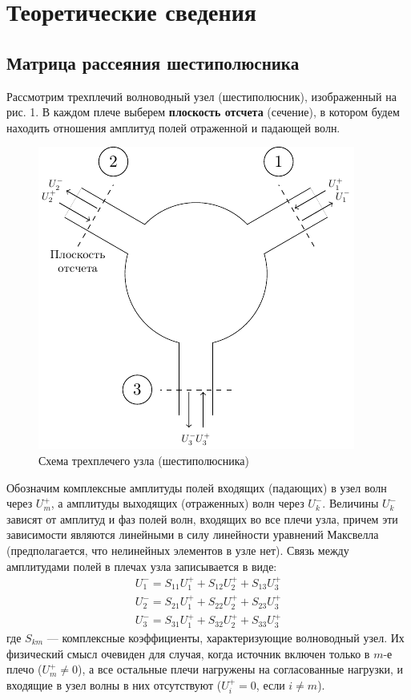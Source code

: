 \documentclass[a4paper,12pt]{article}
\begin{document}
\section{Теоретические сведения}
\subsection{Матрица рассеяния шестиполюсника}

Рассмотрим трехплечий волноводный узел (шестиполюсник), изображенный на рис. 1. В каждом плече выберем \textbf{плоскость отсчета} (сечение), в котором будем находить отношения амплитуд полей отраженной и падающей волн.

\begin{figure}[h!]
	\centering
	\includegraphics[scale=1.5]{ris/ris1}
	\caption{Схема трехплечего узла (шестиполюсника)}
	\label{fig:figure1}
\end{figure}

Обозначим комплексные амплитуды полей входящих (падающих) в узел волн через $U_m^+$, а амплитуды выходящих (отраженных) волн через $U_k^-$. 
Величины $U_k^-$ зависят от амплитуд и фаз полей волн, входящих во все плечи узла, причем эти зависимости являются линейными в силу линейности уравнений Максвелла (предполагается, что нелинейных элементов в узле нет). 
Связь между амплитудами полей в плечах узла записывается в виде:
\begin{equation}
	\begin{array} { l } { U _ { 1 } ^ { - } = S _ { 11 } U _ { 1 } ^ { + } + S _ { 12 } U _ { 2 } ^ { + } + S _ { 13 } U _ { 3 } ^ { + } } \\ { U _ { 2 } ^ { - } = S _ { 21 } U _ { 1 } ^ { + } + S _ { 22 } U _ { 2 } ^ { + } + S _ { 23 } U _ { 3 } ^ { + } } \\ { U _ { 3 } ^ { - } = S _ { 31 } U _ { 1 } ^ { + } + S _ { 32 } U _ { 2 } ^ { + } + S _ { 33 } U _ { 3 } ^ { + } } \end{array}
\end{equation}
где $S_{km}$ ---  комплексные коэффициенты, характеризующие волноводный узел. 
Их физический смысл очевиден для случая, когда источник включен только в $m$-е плечо ($U_m^+\ne0$), а все остальные плечи нагружены на согласованные нагрузки, и входящие в узел волны в них отсутствуют ($U_i^+=0$, если $i\ne m$). 
\end{document}
